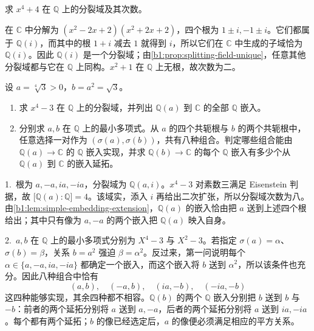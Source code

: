 \BookExercises

\begin{exercise}\label{b1:ex:15-1}
	求 \(x^4+4\) 在 \(\mathbb Q\) 上的分裂域及其次数。
\end{exercise}
\begin{solution}
	在 \(\mathbb C\) 中分解为 \((x^2-2x+2)(x^2+2x+2)\)，四个根为 \(1\pm i,-1\pm i\)。它们都属于 \(\mathbb Q(i)\)，而其中的根 \(1+i\) 减去 \(1\) 就得到 \(i\)，所以它们在 \(\mathbb C\) 中生成的子域恰为 \(\mathbb Q(i)\)。因此 \(\mathbb Q(i)\) 是一个分裂域；由\cref{b1:prop:splitting-field-unique}，任意其他分裂域都与它在 \(\mathbb Q\) 上同构。\(x^2+1\) 在 \(\mathbb Q\) 上无根，故次数为二。
\end{solution}

\begin{exercise}\label{b1:ex:15-2}
	设 \(a=\sqrt[4]3>0\)，\(b=a^2=\sqrt3\)。
	\begin{enumerate}
		\item 求 \(x^4-3\) 在 \(\mathbb Q\) 上的分裂域，并列出 \(\mathbb Q(a)\) 到 \(\mathbb C\) 的全部 \(\mathbb Q\) 嵌入。
		\item 分别求 \(a,b\) 在 \(\mathbb Q\) 上的最小多项式。从 \(a\) 的四个共轭根与 \(b\) 的两个共轭根中，任意选择一对作为 \((\sigma(a),\sigma(b))\)，共有八种组合。判定哪些组合能由 \(\mathbb Q(a)\rightarrow\mathbb C\) 的 \(\mathbb Q\) 嵌入实现，并求 \(\mathbb Q(b)\rightarrow\mathbb C\) 的每个 \(\mathbb Q\) 嵌入有多少个从 \(\mathbb Q(a)\) 到 \(\mathbb C\) 的嵌入延拓。
	\end{enumerate}
\end{exercise}
\begin{solution}
	1.\ 根为 \(a,-a,ia,-ia\)，分裂域为 \(\mathbb Q(a,i)\)。\(x^4-3\) 对素数三满足 Eisenstein 判据，故 \(\bigl[\mathbb Q(a):\mathbb Q\bigr]=4\)。该域实，添入 \(i\) 再给出二次扩张，所以分裂域次数为八。由\cref{b1:lem:simple-embedding-extension}，\(\mathbb Q(a)\) 的嵌入恰由把 \(a\) 送到上述四个根给出；其中只有像为 \(a,-a\) 的两个嵌入把 \(\mathbb Q(a)\) 映入自身。

	2.\ \(a,b\) 在 \(\mathbb Q\) 上的最小多项式分别为 \(X^4-3\) 与 \(X^2-3\)。若指定 \(\sigma(a)=\alpha\)、\(\sigma(b)=\beta\)，关系 \(b=a^2\) 强迫 \(\beta=\alpha^2\)。反过来，第一问说明每个 \(\alpha\in\{a,-a,ia,-ia\}\) 都确定一个嵌入，而这个嵌入将 \(b\) 送到 \(\alpha^2\)，所以该条件也充分。因此八种组合中恰有
	\[
		(a,b),\quad(-a,b),\quad(ia,-b),\quad(-ia,-b)
	\]
	这四种能够实现，其余四种都不相容。\(\mathbb Q(b)\) 的两个 \(\mathbb Q\) 嵌入分别把 \(b\) 送到 \(b\) 与 \(-b\)：前者的两个延拓分别将 \(a\) 送到 \(a,-a\)，后者的两个延拓分别将 \(a\) 送到 \(ia,-ia\)。每个都有两个延拓；\(b\) 的像已经选定后，\(a\) 的像便必须满足相应的平方关系。
\end{solution}

